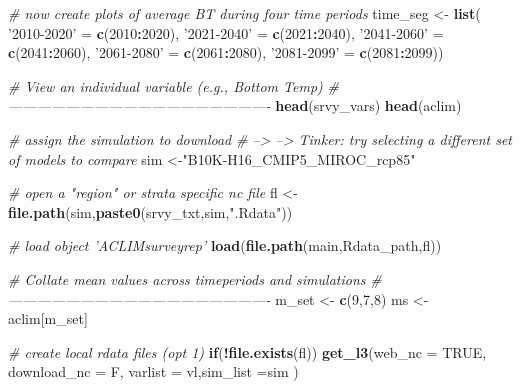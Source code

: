 \documentclass[
]{article}
\newenvironment{Shaded}{\begin{snugshade}}{\end{snugshade}}
\newcommand{\CommentTok}[1]{\textcolor[rgb]{0.56,0.35,0.01}{\textit{#1}}}
\newcommand{\ControlFlowTok}[1]{\textcolor[rgb]{0.13,0.29,0.53}{\textbf{#1}}}
\newcommand{\DataTypeTok}[1]{\textcolor[rgb]{0.13,0.29,0.53}{#1}}
\newcommand{\DecValTok}[1]{\textcolor[rgb]{0.00,0.00,0.81}{#1}}
\newcommand{\KeywordTok}[1]{\textcolor[rgb]{0.13,0.29,0.53}{\textbf{#1}}}
\newcommand{\NormalTok}[1]{#1}
\newcommand{\OperatorTok}[1]{\textcolor[rgb]{0.81,0.36,0.00}{\textbf{#1}}}
\newcommand{\OtherTok}[1]{\textcolor[rgb]{0.56,0.35,0.01}{#1}}
\newcommand{\StringTok}[1]{\textcolor[rgb]{0.31,0.60,0.02}{#1}}
\begin{document}
\begin{Shaded}
\begin{Highlighting}[]
    \CommentTok{# now create plots of average BT during four time periods}
\NormalTok{    time_seg   <-}\StringTok{ }\KeywordTok{list}\NormalTok{( }\StringTok{'2010-2020'}\NormalTok{ =}\StringTok{ }\KeywordTok{c}\NormalTok{(}\DecValTok{2010}\OperatorTok{:}\DecValTok{2020}\NormalTok{),}
                        \StringTok{'2021-2040'}\NormalTok{ =}\StringTok{ }\KeywordTok{c}\NormalTok{(}\DecValTok{2021}\OperatorTok{:}\DecValTok{2040}\NormalTok{),}
                        \StringTok{'2041-2060'}\NormalTok{ =}\StringTok{ }\KeywordTok{c}\NormalTok{(}\DecValTok{2041}\OperatorTok{:}\DecValTok{2060}\NormalTok{),}
                        \StringTok{'2061-2080'}\NormalTok{ =}\StringTok{ }\KeywordTok{c}\NormalTok{(}\DecValTok{2061}\OperatorTok{:}\DecValTok{2080}\NormalTok{),}
                        \StringTok{'2081-2099'}\NormalTok{ =}\StringTok{ }\KeywordTok{c}\NormalTok{(}\DecValTok{2081}\OperatorTok{:}\DecValTok{2099}\NormalTok{))}
  
    \CommentTok{# View an individual variable (e.g., Bottom Temp)}
    \CommentTok{# -------------------------------------------------------}
    \KeywordTok{head}\NormalTok{(srvy_vars)}
    \KeywordTok{head}\NormalTok{(aclim)}
    
    \CommentTok{# assign the simulation to download}
    \CommentTok{# --> --> Tinker: try selecting a different set of models to compare}
\NormalTok{    sim        <-}\StringTok{"B10K-H16_CMIP5_MIROC_rcp85"} 
    
    \CommentTok{# open a "region" or strata specific nc file}
\NormalTok{    fl         <-}\StringTok{ }\KeywordTok{file.path}\NormalTok{(sim,}\KeywordTok{paste0}\NormalTok{(srvy_txt,sim,}\StringTok{".Rdata"}\NormalTok{))}
    
    \CommentTok{# load object 'ACLIMsurveyrep'}
    \KeywordTok{load}\NormalTok{(}\KeywordTok{file.path}\NormalTok{(main,Rdata_path,fl))   }
    
    \CommentTok{# Collate mean values across timeperiods and simulations}
    \CommentTok{# -------------------------------------------------------}
\NormalTok{    m_set      <-}\StringTok{ }\KeywordTok{c}\NormalTok{(}\DecValTok{9}\NormalTok{,}\DecValTok{7}\NormalTok{,}\DecValTok{8}\NormalTok{)}
\NormalTok{    ms         <-}\StringTok{ }\NormalTok{aclim[m_set]}
    
    \CommentTok{# create local rdata files (opt 1)}
    \ControlFlowTok{if}\NormalTok{(}\OperatorTok{!}\KeywordTok{file.exists}\NormalTok{(fl))}
      \KeywordTok{get_l3}\NormalTok{(}\DataTypeTok{web_nc =} \OtherTok{TRUE}\NormalTok{, }\DataTypeTok{download_nc =}\NormalTok{ F,}
          \DataTypeTok{varlist =}\NormalTok{ vl,}\DataTypeTok{sim_list =}\NormalTok{sim )}
    

\end{Highlighting}
\end{Shaded}
\end{document}
